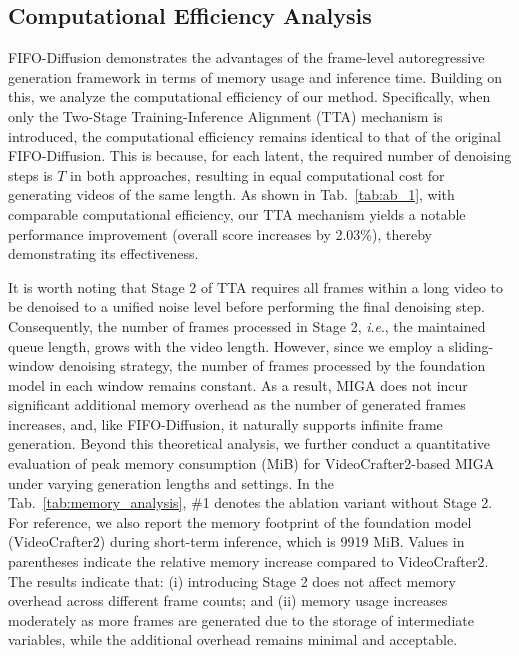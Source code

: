 \documentclass{article}
\theoremstyle{plain}
\theoremstyle{definition}
\theoremstyle{remark}
\newcommand{\ie}{\textit{i}.\textit{e}.}
\begin{document}
\subsection{Computational Efficiency Analysis}
\label{app:comp_eff}

FIFO-Diffusion \cite{kim2024fifo} demonstrates the advantages of the frame-level autoregressive generation framework in terms of memory usage and inference time. Building on this, we analyze the computational efficiency of our method.
Specifically, when only the Two-Stage Training-Inference Alignment (TTA) mechanism is introduced, the computational efficiency remains identical to that of the original FIFO-Diffusion. This is because, for each latent, the required number of denoising steps is $T$ in both approaches, resulting in equal computational cost for generating videos of the same length.
As shown in Tab.~\ref{tab:ab_1}, with comparable computational efficiency, our TTA mechanism yields a notable performance improvement (overall score increases by 2.03\%), thereby demonstrating its effectiveness.

It is worth noting that Stage 2 of TTA requires all frames within a long video to be denoised to a unified noise level before performing the final denoising step. Consequently, the number of frames processed in Stage 2, \ie, the maintained queue length, grows with the video length. However, since we employ a sliding-window denoising strategy, the number of frames processed by the foundation model in each window remains constant. As a result, MIGA does not incur significant additional memory overhead as the number of generated frames increases, and, like FIFO-Diffusion, it naturally supports infinite frame generation. Beyond this theoretical analysis, we further conduct a quantitative evaluation of peak memory consumption (MiB) for VideoCrafter2-based MIGA under varying generation lengths and settings. In the Tab.~\ref{tab:memory_analysis}, \#1 denotes the ablation variant without Stage 2. For reference, we also report the memory footprint of the foundation model (VideoCrafter2) during short-term inference, which is 9919 MiB. Values in parentheses indicate the relative memory increase compared to VideoCrafter2. The results indicate that:
(i) introducing Stage 2 does not affect memory overhead across different frame counts; and
(ii) memory usage increases moderately as more frames are generated due to the storage of intermediate variables, while the additional overhead remains minimal and acceptable.
\end{document}
